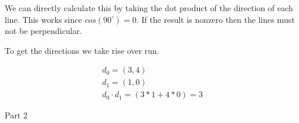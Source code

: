 \documentclass{article}
\begin{document}
\begin{enumerate}
\begin{enumerate}
\begin{mdframed}
                        We can directly calculate this by taking
                        the dot product of the direction of each line.
                        This works since $cos(90^{\circ}) = 0$. If
                        the result is nonzero then the lines must not
                        be perpendicular.

                        To get the directions we take rise over run.

                        \begin{gather}
                            d_0 = (3, 4)\\
                            d_1 = (1, 0)\\
                            d_0 \cdot d_1 = (3 * 1 + 4 * 0) = 3
                        \end{gather}
                    \end{mdframed}
            \end{enumerate}
    \end{enumerate}
    \break

    {\large Part 2}
\end{document}
